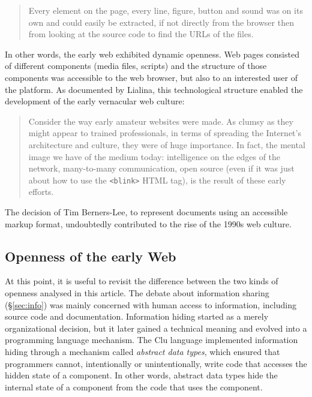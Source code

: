 \begin{quote}
Every element on the page, every line, figure, button and sound was on its own and could easily
be extracted, if not directly from the browser then from looking at the source code to find the
URLs of the files.
\end{quote}

In other words, the early web exhibited dynamic openness. Web pages consisted of different
components (media files, scripts) and the structure of those components was accessible to
the web browser, but also to an interested user of the platform.
As documented by Lialina, this technological structure
enabled the development of the early vernacular web culture:

\begin{quote}
Consider the way early amateur websites were made. As clumsy as they might appear to trained
professionals, in terms of spreading the Internet’s architecture and culture, they were of huge
importance. In fact, the mental image we have of the medium today: intelligence on the edges of the
network, many-to-many communication, open source (even if it was just about how to use the
\texttt{<blink>} HTML tag), is the result of these early efforts.
\end{quote}

The decision of Tim Berners-Lee, to represent documents using an accessible markup format,
undoubtedly contributed to the rise of the 1990s web culture.

\subsection{Openness of the early Web}
At this point, it is useful to revisit the difference between the two kinds of openness analysed
in this article. The debate about information sharing (\S\ref{sec:info}) was mainly concerned with
human access to information, including source code and documentation. Information hiding started as
a merely organizational decision, but it later gained a technical meaning and evolved into a
programming language mechanism.
The Clu language implemented information hiding through a mechanism called \emph{abstract data
types}, which ensured that programmers cannot, intentionally or
unintentionally, write code that accesses the hidden state of a component. In other words,
abstract data types hide the internal state of a component from the code that uses the component.

